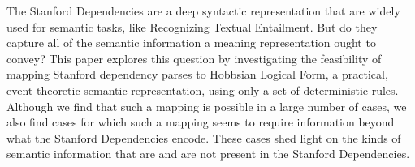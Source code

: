 The Stanford Dependencies are a deep syntactic representation that are widely used for semantic tasks, like Recognizing Textual Entailment. But do they capture all of the semantic information a meaning representation ought to convey? This paper explores this question by investigating the feasibility of mapping Stanford dependency parses to Hobbsian Logical Form, a practical, event-theoretic semantic representation, using only a set of deterministic rules. Although we find that such a mapping is possible in a large number of cases, we also find cases for which such a mapping seems to require information beyond what the Stanford Dependencies encode. These cases shed light on the kinds of semantic information that are and are not present in the Stanford Dependencies.
